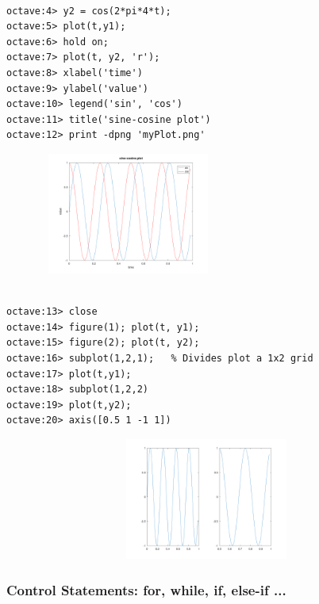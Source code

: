 \documentclass[12pt]{report}
\begin{document}
\begin{lstlisting}[basicstyle=\small]

octave:4> y2 = cos(2*pi*4*t);
octave:5> plot(t,y1);
octave:6> hold on;
octave:7> plot(t, y2, 'r');
octave:8> xlabel('time')
octave:9> ylabel('value')
octave:10> legend('sin', 'cos')
octave:11> title('sine-cosine plot')
octave:12> print -dpng 'myPlot.png'
\end{lstlisting}

\begin{figure}[h]
	\includegraphics[width=6cm, height=4cm]{myPlot.png}
\end{figure}

\begin{lstlisting}[basicstyle=\small]

octave:13> close
octave:14> figure(1); plot(t, y1);
octave:15> figure(2); plot(t, y2);
octave:16> subplot(1,2,1);   % Divides plot a 1x2 grid
octave:17> plot(t,y1);
octave:18> subplot(1,2,2)
octave:19> plot(t,y2);
octave:20> axis([0.5 1 -1 1])
\end{lstlisting}

\begin{figure}[h]
	\includegraphics[width=12cm, height=4cm]{plot2.png}
\end{figure}

\vspace{5mm}
\subsubsection{Control Statements: for, while, if, else-if ...}
\end{document}
